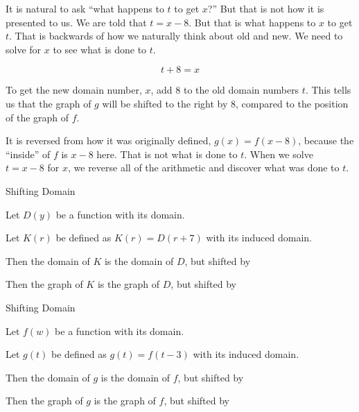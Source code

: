 \documentclass{ximera}
\begin{document}
It is natural to ask ``what happens to $t$ to get $x$?''  But that is not how it is presented to us.  We are told that $t=x-8$.  But that is what happens to $x$ to get $t$.  That is backwards of how we naturally think about old and new.  We need to solve for $x$ to see what is done to $t$.

\[ t+8=x \]

To get the new domain number, $x$, add $8$ to the old domain numbers $t$.  This tells us that the graph of $g$ will be shifted to the right by $8$, compared to the position of the graph of $f$.


It is reversed from how it was originally defined, $g(x) = f(x-8)$, because the ``inside'' of $f$ is $x-8$ here.  That is not what is done to $t$.  When we solve $t=x-8$ for $x$, we reverse all of the arithmetic and discover what was done to $t$.




\begin{example} Shifting Domain


Let $D(y)$ be a function with its domain.

Let $K(r)$ be defined as $K(r) = D(r+7)$ with its induced domain.


Then the domain of $K$ is the domain of $D$, but shifted  by 


Then the graph of $K$ is the graph of $D$, but shifted  by 




\end{example}












\begin{example} Shifting Domain


Let $f(w)$ be a function with its domain.

Let $g(t)$ be defined as $g(t) = f(t-3)$ with its induced domain.


Then the domain of $g$ is the domain of $f$, but shifted  by 


Then the graph of $g$ is the graph of $f$, but shifted  by 




\end{example}
\end{document}
